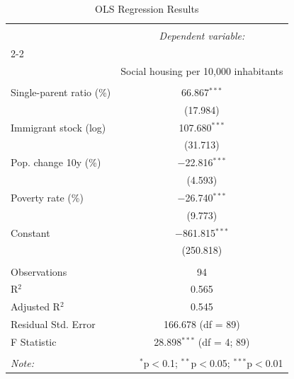 
\begin{table}[!htbp] \centering 
  \caption{OLS Regression Results} 
  \label{tab:ols_results} 
\begin{tabular}{@{\extracolsep{5pt}}lc} 
\\[-1.8ex]\hline 
\hline \\[-1.8ex] 
 & \multicolumn{1}{c}{\textit{Dependent variable:}} \\ 
\cline{2-2} 
\\[-1.8ex] & Social housing per 10,000 inhabitants \\ 
\hline \\[-1.8ex] 
 Single-parent ratio (\%) & 66.867$^{***}$ \\
  & (17.984) \\
 Immigrant stock (log) & 107.680$^{***}$ \\
  & (31.713) \\
 Pop. change 10y (\%) & $-$22.816$^{***}$ \\
  & (4.593) \\
 Poverty rate (\%) & $-$26.740$^{***}$ \\
  & (9.773) \\
 Constant & $-$861.815$^{***}$ \\
  & (250.818) \\ 
\hline \\[-1.8ex] 
Observations & 94 \\ 
R$^{2}$ & 0.565 \\ 
Adjusted R$^{2}$ & 0.545 \\ 
Residual Std. Error & 166.678 (df = 89) \\ 
F Statistic & 28.898$^{***}$ (df = 4; 89) \\ 
\hline 
\hline \\[-1.8ex] 
\textit{Note:}  & \multicolumn{1}{r}{$^{*}$p$<$0.1; $^{**}$p$<$0.05; $^{***}$p$<$0.01} \\ 
\end{tabular} 
\end{table} 
